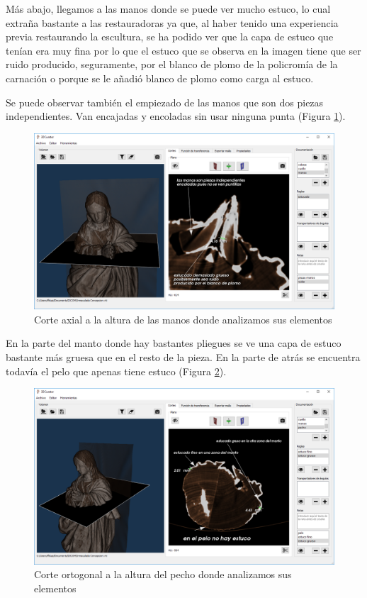 Más abajo, llegamos a las manos donde se puede ver mucho estuco, lo cual extraña bastante a las restauradoras ya que, al haber tenido una experiencia previa restaurando la escultura, se ha podido ver que la capa de estuco que tenían era muy fina por lo que el estuco que se observa en la imagen tiene que ser ruido producido, seguramente, por el blanco de plomo de la policromía de la carnación o porque se le añadió blanco de plomo como carga al estuco.

Se puede observar también el empiezado de las manos que son dos piezas independientes. Van encajadas y encoladas sin usar ninguna punta (Figura \ref{fig:resultados/documentacion/inmaculada-concepcion/manos}).

\begin{figure}[H]
	\centering
	\includegraphics[width=12.5cm]{imagenes/resultados/documentacion/inmaculada-concepcion/manos}
	\caption{Corte axial a la altura de las manos donde analizamos sus elementos}
	\label{fig:resultados/documentacion/inmaculada-concepcion/manos}
\end{figure}

En la parte del manto donde hay bastantes pliegues se ve una capa de estuco bastante más gruesa que en el resto de la pieza. En la parte de atrás se encuentra todavía el pelo que apenas tiene estuco (Figura \ref{fig:resultados/documentacion/inmaculada-concepcion/pecho}).

\begin{figure}[H]
	\centering
	\includegraphics[width=12.5cm]{imagenes/resultados/documentacion/inmaculada-concepcion/pecho}
	\caption{Corte ortogonal a la altura del pecho donde analizamos sus elementos}
	\label{fig:resultados/documentacion/inmaculada-concepcion/pecho}
\end{figure}


